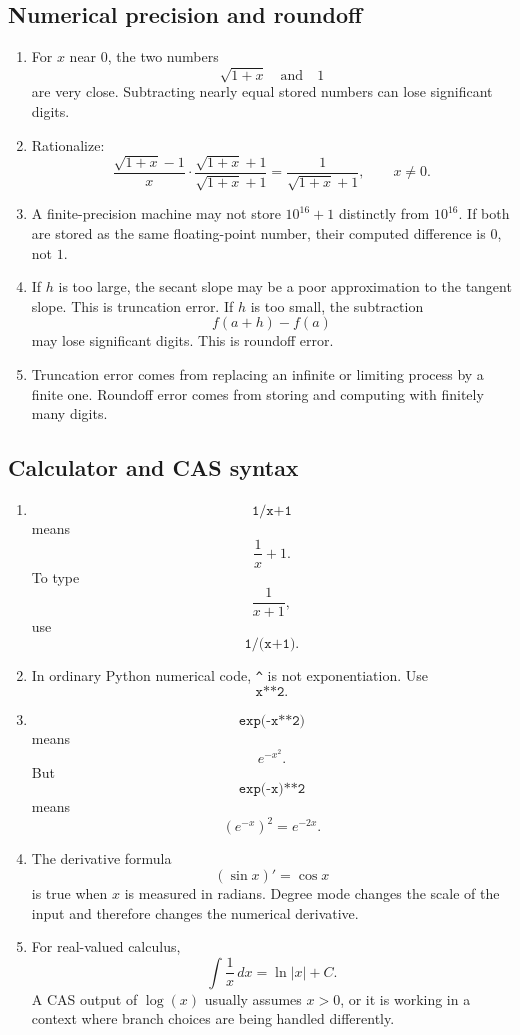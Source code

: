 \subsection*{Numerical precision and roundoff}

\begin{enumerate}
\item
For \(x\) near \(0\), the two numbers
\[
\sqrt{1+x}
\quad\text{and}\quad
1
\]
are very close.  Subtracting nearly equal stored numbers can lose significant digits.

\item
Rationalize:
\[
\frac{\sqrt{1+x}-1}{x}
\cdot
\frac{\sqrt{1+x}+1}{\sqrt{1+x}+1}
=
\frac{1}{\sqrt{1+x}+1},
\qquad x\neq0.
\]

\item
A finite-precision machine may not store \(10^{16}+1\) distinctly from \(10^{16}\).
If both are stored as the same floating-point number, their computed difference is \(0\),
not \(1\).

\item
If \(h\) is too large, the secant slope may be a poor approximation to the tangent
slope.  This is truncation error.  If \(h\) is too small, the subtraction
\[
f(a+h)-f(a)
\]
may lose significant digits.  This is roundoff error.

\item
Truncation error comes from replacing an infinite or limiting process by a finite one.
Roundoff error comes from storing and computing with finitely many digits.
\end{enumerate}

\subsection*{Calculator and CAS syntax}

\begin{enumerate}
\item
\[
\texttt{1/x+1}
\]
means
\[
\frac1x+1.
\]
To type
\[
\frac1{x+1},
\]
use
\[
\texttt{1/(x+1)}.
\]

\item
In ordinary Python numerical code, \texttt{\string^} is not exponentiation.  Use
\[
\texttt{x**2}.
\]

\item
\[
\texttt{exp(-x**2)}
\]
means
\[
e^{-x^2}.
\]
But
\[
\texttt{exp(-x)**2}
\]
means
\[
(e^{-x})^2=e^{-2x}.
\]

\item
The derivative formula
\[
(\sin x)'=\cos x
\]
is true when \(x\) is measured in radians.  Degree mode changes the scale of the input
and therefore changes the numerical derivative.

\item
For real-valued calculus,
\[
\int \frac1x\,dx=\ln|x|+C.
\]
A CAS output of \(\log(x)\) usually assumes \(x>0\), or it is working in a context
where branch choices are being handled differently.
\end{enumerate}

